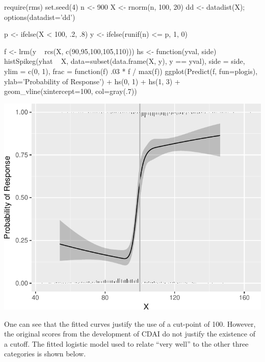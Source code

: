 \begin{Schunk}
\begin{Sinput}
require(rms)
set.seed(4)
n <- 900
X <- rnorm(n, 100, 20)
dd <- datadist(X); options(datadist='dd')

p <- ifelse(X < 100, .2, .8)
y <- ifelse(runif(n) <= p, 1, 0)

f <- lrm(y ~ rcs(X, c(90,95,100,105,110)))
hs <- function(yval, side)
  histSpikeg(yhat ~ X, data=subset(data.frame(X, y), y == yval),
             side = side, ylim = c(0, 1),
             frac = function(f) .03 * f / max(f))
ggplot(Predict(f, fun=plogis), ylab='Probability of Response') +
  hs(0, 1) + hs(1, 3) + geom_vline(xintercept=100, col=gray(.7))
\end{Sinput}


\centerline{\includegraphics[width=\maxwidth]{info-cutpointExists-1} }

\end{Schunk}

One can see that the fitted curves justify the use of a cut-point of
100.  However, the original scores from the development of CDAI do not
justify the existence of a cutoff.  The fitted logistic model used to
relate ``very well'' to the other three categories is shown below.


